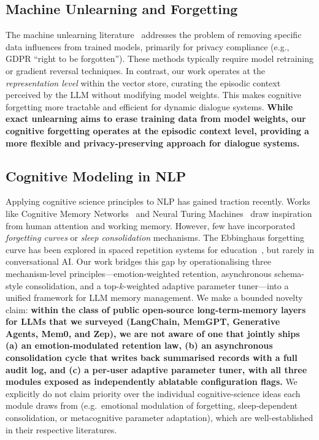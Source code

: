\subsection{Machine Unlearning and Forgetting}
The machine unlearning literature~\cite{sekhar2021unlearning, guo2024unlearning} addresses the problem of removing specific data influences from trained models, primarily for privacy compliance (e.g., GDPR ``right to be forgotten''). These methods typically require model retraining or gradient reversal techniques. In contrast, our work operates at the \textit{representation level} within the vector store, curating the episodic context perceived by the LLM without modifying model weights. This makes cognitive forgetting more tractable and efficient for dynamic dialogue systems. \textbf{While exact unlearning aims to erase training data from model weights, our cognitive forgetting operates at the episodic context level, providing a more flexible and privacy-preserving approach for dialogue systems.}

\subsection{Cognitive Modeling in NLP}
Applying cognitive science principles to NLP has gained traction recently. Works like Cognitive Memory Networks~\cite{cognitive_mem} and Neural Turing Machines~\cite{ntm} draw inspiration from human attention and working memory. However, few have incorporated \textit{forgetting curves} or \textit{sleep consolidation} mechanisms. The Ebbinghaus forgetting curve has been explored in spaced repetition systems for education~\cite{ebbinghaus_app}, but rarely in conversational AI. Our work bridges this gap by operationalising three mechanism-level principles---emotion-weighted retention, asynchronous schema-style consolidation, and a top-$k$-weighted adaptive parameter tuner---into a unified framework for LLM memory management. We make a bounded novelty claim: \textbf{within the class of public open-source long-term-memory layers for LLMs that we surveyed (LangChain, MemGPT, Generative Agents, Mem0, and Zep), we are not aware of one that jointly ships (a) an emotion-modulated retention law, (b) an asynchronous consolidation cycle that writes back summarised records with a full audit log, and (c) a per-user adaptive parameter tuner, with all three modules exposed as independently ablatable configuration flags.} We explicitly do not claim priority over the individual cognitive-science ideas each module draws from (e.g.\ emotional modulation of forgetting, sleep-dependent consolidation, or metacognitive parameter adaptation), which are well-established in their respective literatures.
